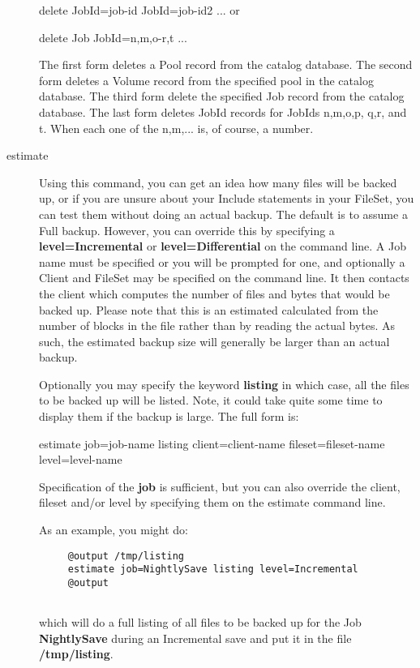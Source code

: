 \begin{description}
delete JobId=\lt{}job-id\gt{} JobId=\lt{}job-id2\gt{} ...  or  

delete Job JobId=n,m,o-r,t ...  

The first form deletes a Pool record  from the catalog database. The second
form deletes a Volume record  from the specified pool in the catalog database.
The  third form delete the specified Job record from the catalog  database.
The last form deletes JobId records for JobIds n,m,o,p,  q,r, and t. When each
one of the n,m,... is, of course, a number.  
\label{estimate}

\item [estimate]
   Using this command, you can get an idea how  many files will be backed up, or
if you are unsure about  your Include statements in your FileSet, you can test
them  without doing an actual backup. The default is to assume  a Full backup.
However, you can override this by specifying  a {\bf level=Incremental} or
{\bf level=Differential}  on the command line. A Job name must  be specified
or you will be prompted for one,  and optionally a Client and FileSet may be
specified  on the command line. It then  contacts the client which computes
the number of files and  bytes that would be backed up. Please note that this
is  an estimated calculated from the number of blocks in the  file rather than
by reading the actual bytes. As such, the  estimated backup size will
generally be larger than  an actual backup.  

Optionally you may specify the keyword {\bf listing} in  which case, all the
files to be backed up will be listed.  Note, it could take quite some time to
display them if the  backup is large. The full form is:  

estimate job=\lt{}job-name\gt{} listing client=\lt{}client-name\gt{} 
fileset=\lt{}fileset-name\gt{} level=\lt{}level-name\gt{}  

Specification of the {\bf job} is sufficient, but you can also  override the
client, fileset and/or level  by specifying them on the estimate command line.
 

As an example, you might do:  

\footnotesize
\begin{verbatim}
     @output /tmp/listing
     estimate job=NightlySave listing level=Incremental
     @output
     
\end{verbatim}
\normalsize

which will do a full listing of all files to be backed up for the  Job {\bf
NightlySave} during an Incremental save and put it in the  file {\bf
/tmp/listing}. 


\end{description}
